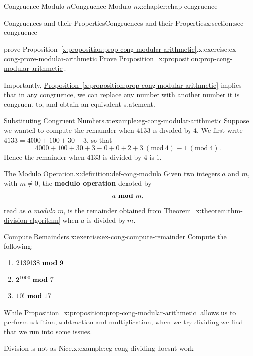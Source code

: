 \documentclass[oneside,10pt,]{book}
\newcommand{\xreffont}{\relax}
\newcommand{\terminology}[1]{\textbf{#1}}
\numberwithin{equation}{section}
\newcommand{\Mod}[1]{\ \left(\mathrm{mod}\ #1\right)}
\newcommand{\mmod}[1]{\ \mathrm{\bf mod}\ #1}
\begin{document}
\begin{chapterptx}{Congruence Modulo \(n\)}{}{Congruence Modulo \(n\)}{}{}{x:chapter:chap-congruence}
\begin{sectionptx}{Congruences and their Properties}{}{Congruences and their Properties}{}{}{x:section:sec-congruence}
\begin{inlineexercise}{prove Proposition~{\xreffont\ref*{x:proposition:prop-cong-modular-arithmetic}}.}{x:exercise:ex-cong-prove-modular-arithmetic}
Prove \hyperref[x:proposition:prop-cong-modular-arithmetic]{Proposition~{\xreffont\ref{x:proposition:prop-cong-modular-arithmetic}}}.%
\end{inlineexercise}
Importantly, \hyperref[x:proposition:prop-cong-modular-arithmetic]{Proposition~{\xreffont\ref{x:proposition:prop-cong-modular-arithmetic}}} implies that in any congruence, we can replace any number with another number it is congruent to, and obtain an equivalent statement.%
\begin{example}{Substituting Congruent Numbers.}{x:example:eg-cong-modular-arithmetic}%
Suppose we wanted to compute the remainder when 4133 is divided by 4. We first write \(4133 = 4000 + 100 + 30 + 3\), so that%
\begin{equation*}
4000 + 100 + 30 + 3 \equiv 0 + 0 + 2 + 3 \Mod{4} \equiv 1 \Mod{4}\text{.}
\end{equation*}
Hence the remainder when 4133 is divided by 4 is 1.%
\end{example}
\begin{definition}{The Modulo Operation.}{x:definition:def-cong-modulo}%
Given two integers \(a\) and \(m\), with \(m \ne 0\), the \terminology{modulo operation} denoted by%
\begin{equation*}
a \mmod{m}\text{,}
\end{equation*}
read as \emph{\(a\) modulo \(m\)}, is the remainder obtained from \hyperref[x:theorem:thm-division-algorithm]{Theorem~{\xreffont\ref{x:theorem:thm-division-algorithm}}} when \(a\) is divided by \(m\). \label{g:notation:id445197}%
\end{definition}
\begin{inlineexercise}{Compute Remainders.}{x:exercise:ex-cong-compute-remainder}%
Compute the following:%
\begin{enumerate}[label=(\alph*)]
\item{}\(\displaystyle 2139138 \mmod 9\)%
\item{}\(\displaystyle 2^{1000} \mmod 7\)%
\item{}\(\displaystyle 10! \mmod 17\)%
\end{enumerate}
%
\end{inlineexercise}
While \hyperref[x:proposition:prop-cong-modular-arithmetic]{Proposition~{\xreffont\ref{x:proposition:prop-cong-modular-arithmetic}}} allows us to perform addition, subtraction and multiplication, when we try dividing we find that we run into some issues.%
\begin{example}{Division is not as Nice.}{x:example:eg-cong-dividing-doesnt-work}%

\end{example}
\end{sectionptx}
\end{chapterptx}
\end{document}

